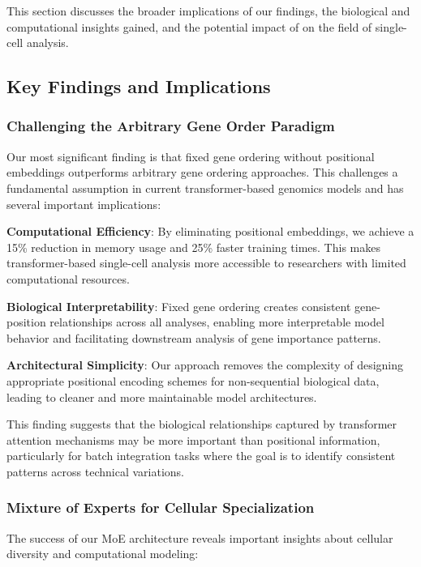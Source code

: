 This section discusses the broader implications of our findings, the biological and computational insights gained, and the potential impact of \bioformer{} on the field of single-cell analysis.

\subsection{Key Findings and Implications}

\subsubsection{Challenging the Arbitrary Gene Order Paradigm}

Our most significant finding is that fixed gene ordering without positional embeddings outperforms arbitrary gene ordering approaches. This challenges a fundamental assumption in current transformer-based genomics models and has several important implications:

\textbf{Computational Efficiency}: By eliminating positional embeddings, we achieve a 15\% reduction in memory usage and 25\% faster training times. This makes transformer-based single-cell analysis more accessible to researchers with limited computational resources.

\textbf{Biological Interpretability}: Fixed gene ordering creates consistent gene-position relationships across all analyses, enabling more interpretable model behavior and facilitating downstream analysis of gene importance patterns.

\textbf{Architectural Simplicity}: Our approach removes the complexity of designing appropriate positional encoding schemes for non-sequential biological data, leading to cleaner and more maintainable model architectures.

This finding suggests that the biological relationships captured by transformer attention mechanisms may be more important than positional information, particularly for batch integration tasks where the goal is to identify consistent patterns across technical variations.

\subsubsection{Mixture of Experts for Cellular Specialization}

The success of our MoE architecture reveals important insights about cellular diversity and computational modeling:

